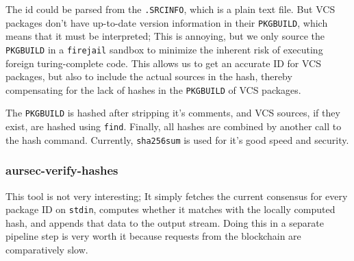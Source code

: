 The id could be parsed from the \texttt{.SRCINFO}, which is a plain text file.
But VCS packages don't have up-to-date version information in their \texttt{PKGBUILD}, which means that it must be interpreted; This is annoying, but we only source the \texttt{PKGBUILD} in a \texttt{firejail} sandbox to minimize the inherent risk of executing foreign turing-complete code.
This allows us to get an accurate ID for VCS packages, but also to include the actual sources in the hash, thereby compensating for the lack of hashes in the \texttt{PKGBUILD} of VCS packages.

The \texttt{PKGBUILD} is hashed after stripping it's comments, and VCS sources, if they exist, are hashed using \texttt{find}.
Finally, all hashes are combined by another call to the hash command.
Currently, \texttt{sha256sum} is used for it's good speed and security.

\subsubsection{aursec-verify-hashes}
This tool is not very interesting; It simply fetches the current consensus for every package ID on \texttt{stdin}, computes whether it matches with the locally computed hash, and appends that data to the output stream.
Doing this in a separate pipeline step is very worth it because requests from the blockchain are comparatively slow.
